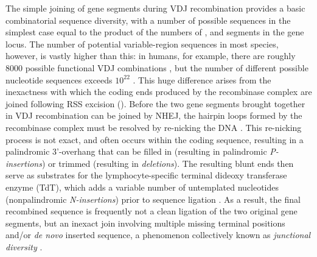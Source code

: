 The simple joining of gene segments during VDJ recombination provides a basic combinatorial sequence diversity, with a number of possible sequences in the simplest case equal to the product of the numbers of \vh, \dh and \jh segments in the \igh{} gene locus. The number of potential \igh{} variable-region sequences in most species, however, is vastly higher than this: in humans, for example, there are roughly 8000 possible functional VDJ combinations \parencite{lefranc2001humanheavy}, but the number of different possible nucleotide sequences exceeds $10^{22}$ \parencite{elhanati2015model}. This huge difference arises from the inexactness with which the coding ends produced by the recombinase complex are joined following RSS excision (). Before the two gene segments brought together in VDJ recombination can be joined by NHEJ, the hairpin loops formed by the recombinase complex must be resolved by re-nicking the DNA \parencite{schroeder2010immunoglobulins,schatz2011vdjr}. This re-nicking process is not exact, and often occurs within the coding sequence, resulting in a palindromic 3'-overhang that can be filled in (resulting in palindromic \textit{P-insertions}) or trimmed (resulting in \textit{deletions}). The resulting blunt ends then serve as substrates for the lymphocyte-specific terminal dideoxy transferase enzyme (TdT), which adds a variable number of untemplated nucleotides (nonpalindromic \textit{N-insertions}) prior to sequence ligation \parencite{schroeder2010immunoglobulins,schatz2011vdjr}. As a result, the final recombined sequence is frequently not a clean ligation of the two original gene segments, but an inexact join involving multiple missing terminal positions and/or \textit{de novo} inserted sequence, a phenomenon collectively known as \textit{junctional diversity} \parencite{flaherty2012chapter}.


